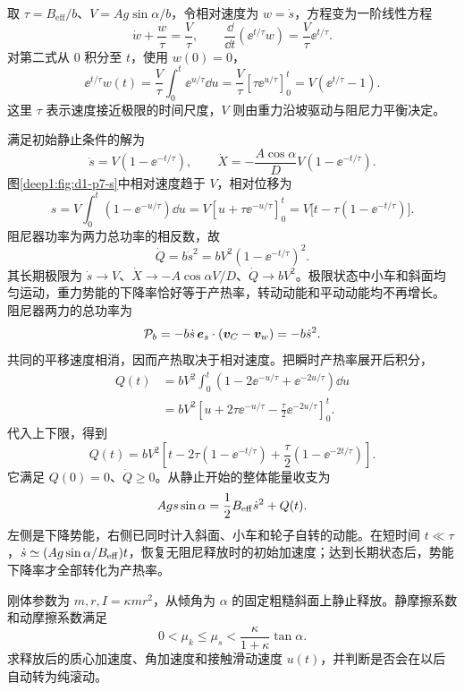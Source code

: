 \begin{solution}
取 $\tau=B_{\text{eff}}/b$、$V=Ag\sin\alpha/b$，令相对速度为 $w=\dot s$，方程变为一阶线性方程
\[
\dot w+\frac w\tau=\frac V\tau,\qquad
\frac{\dd}{\dd t}(\ee^{t/\tau}w)=\frac V\tau\ee^{t/\tau}.
\]
对第二式从 0 积分至 $t$，使用 $w(0)=0$，
\[
\ee^{t/\tau}w(t)=\frac V\tau\int_0^t\ee^{u/\tau}\dd u
=\frac V\tau[\tau\ee^{u/\tau}]_0^t
=V(\ee^{t/\tau}-1).
\]
这里 $\tau$ 表示速度接近极限的时间尺度，$V$ 则由重力沿坡驱动与阻尼力平衡决定。

满足初始静止条件的解为
\[
\boxed{\dot s=V(1-\ee^{-t/\tau})},\qquad
\boxed{\dot X=-\frac{A\cos\alpha}{D}V(1-\ee^{-t/\tau})}.
\]
图\ref{deep1:fig:d1-p7-s}中相对速度趋于 $V$，相对位移为
\[
s=V\int_0^t(1-\ee^{-u/\tau})\dd u
=V[u+\tau\ee^{-u/\tau}]_0^t
=V\big[t-\tau(1-\ee^{-t/\tau})\big].
\]
阻尼器功率为两力总功率的相反数，故
\[
\boxed{\dot Q=b\dot s^2=bV^2(1-\ee^{-t/\tau})^2}.
\]
其长期极限为 $\dot s\to V$、$\dot X\to-A\cos\alpha V/D$、$\dot Q\to bV^2$。极限状态中小车和斜面均匀运动，重力势能的下降率恰好等于产热率，转动动能和平动动能均不再增长。
阻尼器两力的总功率为
\[
\mathcal P_b=-b\dot s\,\bm{e}_s\cdot(\bm{v}_C-\bm{v}_w)
=-b\dot s^2.
\]
共同的平移速度相消，因而产热取决于相对速度。把瞬时产热率展开后积分，
\[
\begin{aligned}
Q(t)&=bV^2\int_0^t(1-2\ee^{-u/\tau}+\ee^{-2u/\tau})\dd u\\
&=bV^2\left[u+2\tau\ee^{-u/\tau}-\frac\tau2\ee^{-2u/\tau}\right]_0^t.
\end{aligned}
\]
代入上下限，得到
\[
Q(t)=bV^2\left[t-2\tau(1-\ee^{-t/\tau})
+\frac\tau2(1-\ee^{-2t/\tau})\right].
\]
它满足 $Q(0)=0$、$\dot Q\ge0$。从静止开始的整体能量收支为
\[
Ags\sin\alpha=\frac12B_{\rm eff}\dot s^2+Q(t).
\]
左侧是下降势能，右侧已同时计入斜面、小车和轮子自转的动能。在短时间 $t\ll\tau$，$\dot s\simeq(Ag\sin\alpha/B_{\rm eff})t$，恢复无阻尼释放时的初始加速度；达到长期状态后，势能下降率才全部转化为产热率。

\end{solution}


\begin{exercise}[摩擦不足时会不会自行滚起来]\label{deep1:problem-exercise-10}\label{deep1:exercise:d1-p10}
刚体参数为 $m,r,I=\kappa mr^2$，从倾角为 $\alpha$ 的固定粗糙斜面上静止释放。静摩擦系数和动摩擦系数满足
\[
0<\mu_k\le\mu_s<\frac{\kappa}{1+\kappa}\tan\alpha.
\]
求释放后的质心加速度、角加速度和接触滑动速度 $u(t)$，并判断是否会在以后自动转为纯滚动。
\end{exercise}

